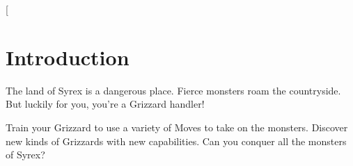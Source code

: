 \documentclass[9pt,twocolumn,openany,article]{memoir}
\begin{document}
\fi

\thispagestyle{empty}

\twocolumn[

\chapter*{Introduction}\label{Introduction}

The  land of  Syrex  is  a dangerous  place.  Fierce  monsters roam  the
countryside. But luckily for you, you're a Grizzard handler!

\bigskip

Train your Grizzard to  use a variety of Moves to  take on the monsters.
Discover new kinds  of Grizzards with new capabilities.  Can you conquer
all the monsters of Syrex?
\end{document}
